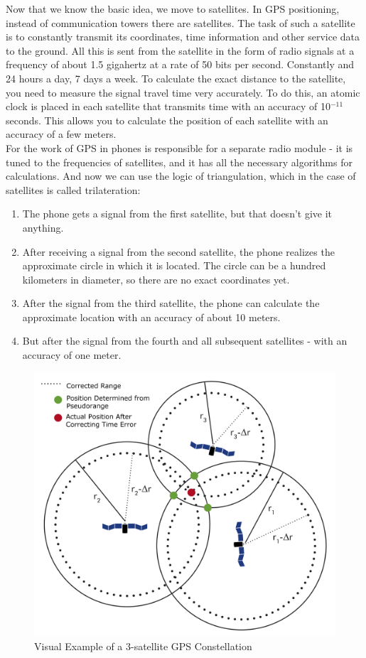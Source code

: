 \documentclass[10pt,oneside,english,a4paper]{article}
\begin{document}
Now that we know the basic idea, we move to satellites. In GPS positioning, instead of communication towers there are satellites. The task of such a satellite is to constantly transmit its coordinates, time information and other service data to the ground. All this is sent from the satellite in the form of radio signals at a frequency of about 1.5 gigahertz at a rate of 50 bits per second. Constantly and 24 hours a day, 7 days a week. To calculate the exact distance to the satellite, you need to measure the signal travel time very accurately. To do this, an atomic clock is placed in each satellite that transmits time with an accuracy of 10$^{-11}$ seconds. This allows you to calculate the position of each satellite with an accuracy of a few meters. 
\\For the work of GPS in phones is responsible for a separate radio module - it is tuned to the frequencies of satellites, and it has all the necessary algorithms for calculations. And now we can use the logic of triangulation, which in the case of satellites is called trilateration\cite{Bajaj2002}:

\begin{enumerate}
\item The phone gets a signal from the first satellite, but that doesn't give it anything.
\item After receiving a signal from the second satellite, the phone realizes the approximate circle in which it is located. The circle can be a hundred kilometers in diameter, so there are no exact coordinates yet.
\item After the signal from the third satellite, the phone can calculate the approximate location with an accuracy of about 10 meters.
\item But after the signal from the fourth and all subsequent satellites - with an accuracy of one meter.
\end{enumerate}

\begin{figure}[h]
	\centering
	\includegraphics[scale=0.07]{diagram3.png}
	\caption{Visual Example of a 3-satellite GPS Constellation}
	\label{fig:trilateration}
\end{figure}
\end{document}
